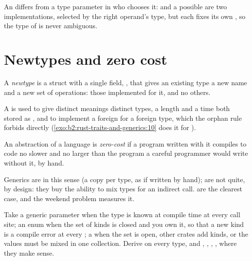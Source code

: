 An  differs from a type parameter in who chooses it:  and a possible
 are two implementations, selected by the right operand's type, but each fixes its own
, so the type of  is never ambiguous.

\section{Newtypes and zero cost}\label{sec:b2:rust-traits-and-generics:zero}

\begin{definition}[Newtype]\label{def:b2:rust-traits-and-generics:newtype}
A \emph{newtype} is a struct with a single field, , that gives an existing
type a new name and a new set of operations: those implemented for it, and no others.
\end{definition}

A  is used to give distinct meanings distinct types, a length and a time both stored as , and to
implement a foreign  for a foreign type, which the orphan rule forbids directly
(\cref{exo:b2:rust-traits-and-generics:10} does it for ).

\begin{definition}\label{def:b2:rust-traits-and-generics:zero-cost}
An abstraction of a language is \emph{zero-cost} if a program written with it compiles
to code no slower and no larger than the program a careful programmer would write without it, by hand.
\end{definition}

Generics are  in this sense (a copy per type, as if written by hand);  are not quite, by
design: they buy the ability to mix types for an indirect call.  are the clearest case, and the weekend
problem measures it.

\begin{inpractice}
Take a generic parameter when the type is known at compile time at every call site; an enum when the set of kinds is
closed and you own it, so that a new kind is a compile error at every ; a  when the set is
open, other crates add kinds, or the values must be mixed in one collection. Derive  on every type, and
, , , ,  where they make sense.
\end{inpractice}

